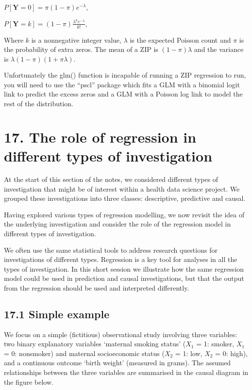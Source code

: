 \documentclass[letterpaper,10pt,english]{jupyterBook}
\begin{document}
\sphinxAtStartPar
\(P[\mathbf{Y}=0] = \pi (1-\pi)e^{- \lambda }\),

\sphinxAtStartPar
\(P[\mathbf{Y}=k] = (1-\pi)\frac{\lambda^{k}e^{-\lambda}}{k!}\),

\sphinxAtStartPar
Where \(k\) is a non\sphinxhyphen{}negative integer value, \(\lambda\) is the expected Poisson count and \(\pi\) is the probability of extra zeros. The mean of a ZIP is \((1-\pi)\lambda\) and the variance is \(\lambda (1-\pi) (1+\pi \lambda)\).

\sphinxAtStartPar
Unfortunately the glm() function is incapable of running a ZIP regression to run, you will need to use the “pscl” package which fits a GLM with a binomial logit link to predict the excess zeros and a GLM with a Poisson log link to model the rest of the distribution.


\chapter{17. The role of regression in different types of investigation}
\label{\detokenize{17. Investigations round up:the-role-of-regression-in-different-types-of-investigation}}\label{\detokenize{17. Investigations round up::doc}}
\sphinxAtStartPar
At the start of this section of the notes, we considered different types of investigation that might be of interest within a health data science project. We grouped these investigations into three classes: descriptive, predictive and causal.

\sphinxAtStartPar
Having explored various types of regression modelling, we now revisit the idea of the underlying investigation and consider the role of the regression model in different types of investigation.

\sphinxAtStartPar
We often use the same statistical tools to address research questions for investigations of different types. Regression is a key tool for analyses in all the types of investigation. In this short session we illustrate how the same regression model could be used in prediction and causal investigations, but that the output from the regression should be used and interpreted differently.


\section{17.1  Simple example}
\label{\detokenize{17. Investigations round up:simple-example}}
\sphinxAtStartPar
We focus on a simple (fictitious) observational study involving three variables: two binary explanatory variables ‘maternal smoking status’ (\(X_{1}\) = 1: smoker, \(X_{1}\) = 0: non\sphinxhyphen{}smoker) and maternal socioeconomic status (\(X_{2}\) = 1: low, \(X_{2}\) = 0: high), and a continuous outcome ‘birth weight’ (measured in grams). The assumed relationships between the three variables are summarised in the causal diagram in the figure below.
\end{document}
